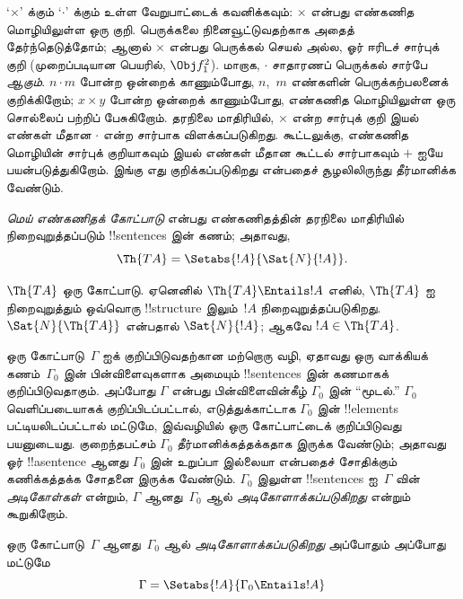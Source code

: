 \documentclass[../../../include/open-logic-section]{subfiles}
\begin{document}
`$\times$' க்கும் `$\cdot$' க்கும் உள்ள வேறுபாட்டைக் கவனிக்கவும்:
$\times$ என்பது எண்கணித மொழியிலுள்ள ஒரு குறி. பெருக்கலை நினைவூட்டுவதற்காக
அதைத் தேர்ந்தெடுத்தோம்; ஆனால் $\times$ என்பது பெருக்கல் செயல் அல்ல, ஓர்
ஈரிடச் சார்புக் குறி (முறைப்படியான பெயரில், $\Obj f^2_1$). மாறாக,
$\cdot$ சாதாரணப் பெருக்கல் சார்பே \emph{ஆகும்}. $n \cdot m$ போன்ற ஒன்றைக்
காணும்போது, $n$,~$m$ எண்களின் பெருக்கற்பலனைக் குறிக்கிறோம்; $x \times y$
போன்ற ஒன்றைக் காணும்போது, எண்கணித மொழியிலுள்ள ஒரு சொல்லைப் பற்றிப் பேசுகிறோம்.
தரநிலை மாதிரியில், $\times$ என்ற சார்புக் குறி இயல் எண்கள் மீதான
$\cdot$ என்ற சார்பாக விளக்கப்படுகிறது. கூட்டலுக்கு, எண்கணித மொழியின்
சார்புக் குறியாகவும் இயல் எண்கள் மீதான கூட்டல் சார்பாகவும் $+$ ஐயே
பயன்படுத்துகிறோம். இங்கு எது குறிக்கப்படுகிறது என்பதைச் சூழலிலிருந்து
தீர்மானிக்க வேண்டும்.

\begin{defn}
\emph{மெய் எண்கணிதக் கோட்பாடு} என்பது எண்கணிதத்தின் தரநிலை மாதிரியில்
நிறைவுறுத்தப்படும் !!{sentence}s இன் கணம்; அதாவது,
\[
\Th{TA} = \Setabs{!A}{\Sat{N}{!A}}.
\]
\end{defn}

$\Th{TA}$ ஒரு கோட்பாடு. ஏனெனில் $\Th{TA} \Entails !A$ எனில்,
$\Th{TA}$ ஐ நிறைவுறுத்தும் ஒவ்வொரு !!{structure} இலும்~$!A$
நிறைவுறுத்தப்படுகிறது. $\Sat{N}{\Th{TA}}$ என்பதால் $\Sat{N}{!A}$;
ஆகவே $!A \in \Th{TA}$.

ஒரு கோட்பாடு~$\Gamma$ ஐக் குறிப்பிடுவதற்கான மற்றொரு வழி, ஏதாவது ஒரு
வாக்கியக் கணம்~$\Gamma_0$ இன் பின்விளைவுகளாக அமையும் !!{sentence}s இன்
கணமாகக் குறிப்பிடுவதாகும். அப்போது $\Gamma$ என்பது பின்விளைவின்கீழ்
$\Gamma_0$ இன் ``மூடல்.'' $\Gamma_0$ வெளிப்படையாகக் குறிப்பிடப்பட்டால்,
எடுத்துக்காட்டாக $\Gamma_0$ இன் !!{element}s பட்டியலிடப்பட்டால் மட்டுமே, இவ்வழியில்
ஒரு கோட்பாட்டைக் குறிப்பிடுவது பயனுடையது. குறைந்தபட்சம் $\Gamma_0$
தீர்மானிக்கத்தக்கதாக இருக்க வேண்டும்; அதாவது ஓர் !!a{sentence} ஆனது
$\Gamma_0$ இன் உறுப்பா இல்லையா என்பதைச் சோதிக்கும் கணிக்கத்தக்க சோதனை
இருக்க வேண்டும். $\Gamma_0$ இலுள்ள !!{sentence}s ஐ~$\Gamma$ வின்
\emph{அடிகோள்கள்} என்றும், $\Gamma$ ஆனது~$\Gamma_0$ ஆல்
\emph{அடிகோளாக்கப்படுகிறது} என்றும் கூறுகிறோம்.

\begin{defn}
ஒரு கோட்பாடு~$\Gamma$ ஆனது~$\Gamma_0$ ஆல் \emph{அடிகோளாக்கப்படுகிறது}
அப்போதும் அப்போது மட்டுமே
\[
\Gamma = \Setabs{!A}{\Gamma_0 \Entails !A}
\]
\end{defn}
\end{document}
